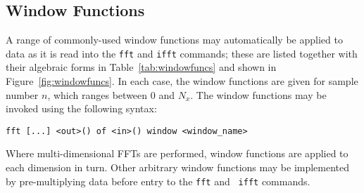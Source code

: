 \subsection{Window Functions}

A range of commonly-used window functions may automatically be applied to data
as it is read into the {\tt fft} and {\tt ifft} commands; these are listed
together with their algebraic forms in Table~\ref{tab:windowfuncs} and shown in
Figure~\ref{fig:windowfuncs}. In each case, the window functions are given for
sample number $n$, which ranges between $0$ and $N_x$. The window functions may
be invoked using the following syntax:

\begin{verbatim}
fft [...] <out>() of <in>() window <window_name>
\end{verbatim}

\noindent Where multi-dimensional FFTs are performed, window functions are
applied to each dimension in turn.  Other arbitrary window functions may be
implemented by pre-multiplying data before entry to the {\tt fft} and {\tt
ifft} commands.

